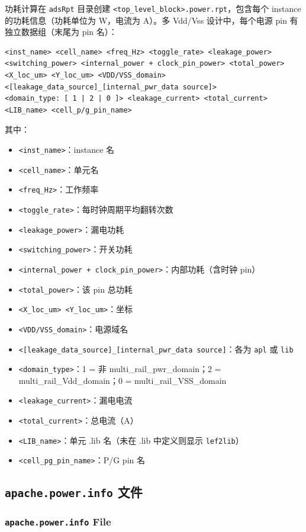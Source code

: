 功耗计算在 \texttt{adsRpt} 目录创建 \texttt{<top\_level\_block>.power.rpt}，包含每个 instance 的功耗信息（功耗单位为 W，电流为 A）。多 Vdd/Vss 设计中，每个电源 pin 有独立数据组（末尾为 pin 名）：
\begin{lstlisting}
<inst_name> <cell_name> <freq_Hz> <toggle_rate> <leakage_power>
<switching_power> <internal_power + clock_pin_power> <total_power>
<X_loc_um> <Y_loc_um> <VDD/VSS_domain>
<[leakage_data_source]_[internal_pwr_data source]>
<domain_type: [ 1 | 2 | 0 ]> <leakage_current> <total_current>
<LIB_name> <cell_p/g_pin_name>
\end{lstlisting}
其中：
\begin{itemize}
  \item \texttt{<inst\_name>}：instance 名
  \item \texttt{<cell\_name>}：单元名
  \item \texttt{<freq\_Hz>}：工作频率
  \item \texttt{<toggle\_rate>}：每时钟周期平均翻转次数
  \item \texttt{<leakage\_power>}：漏电功耗
  \item \texttt{<switching\_power>}：开关功耗
  \item \texttt{<internal\_power + clock\_pin\_power>}：内部功耗（含时钟 pin）
  \item \texttt{<total\_power>}：该 pin 总功耗
  \item \texttt{<X\_loc\_um> <Y\_loc\_um>}：坐标
  \item \texttt{<VDD/VSS\_domain>}：电源域名
  \item \texttt{<[leakage\_data\_source]\_[internal\_pwr\_data source]}：各为 \texttt{apl} 或 \texttt{lib}
  \item \texttt{<domain\_type>}：1 = 非 multi\_rail\_pwr\_domain；2 = multi\_rail\_Vdd\_domain；0 = multi\_rail\_VSS\_domain
  \item \texttt{<leakage\_current>}：漏电电流
  \item \texttt{<total\_current>}：总电流（A）
  \item \texttt{<LIB\_name>}：单元 .lib 名（未在 .lib 中定义则显示 \texttt{lef2lib}）
  \item \texttt{<cell\_pg\_pin\_name>}：P/G pin 名
\end{itemize}

\subsection{\texttt{apache.power.info} 文件}
\subsubsection*{\texttt{apache.power.info} File}

